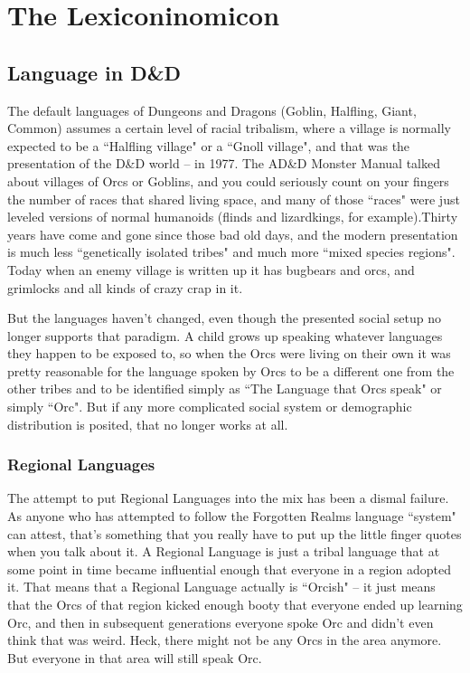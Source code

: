\section{The Lexiconinomicon} %

\subsection{Language in D\&D}
\vspace*{-8pt}

The default languages of Dungeons and Dragons (Goblin, Halfling, Giant, Common) assumes a certain level of racial tribalism, where a village is normally expected to be a ``Halfling village" or a ``Gnoll village", and that was the presentation of the D\&D world -- in 1977. The AD\&D Monster Manual talked about villages of Orcs or Goblins, and you could seriously count on your fingers the number of races that shared living space, and many of those ``races" were just leveled versions of normal humanoids (flinds and lizardkings, for example).Thirty years have come and gone since those bad old days, and the modern presentation is much less ``genetically isolated tribes" and much more ``mixed species regions". Today when an enemy village is written up it has bugbears and orcs, and grimlocks and all kinds of crazy crap in it.

But the languages haven't changed, even though the presented social setup no longer supports that paradigm. A child grows up speaking whatever languages they happen to be exposed to, so when the Orcs were living on their own it was pretty reasonable for the language spoken by Orcs to be a different one from the other tribes and to be identified simply as ``The Language that Orcs speak" or simply ``Orc". But if any more complicated social system or demographic distribution is posited, that no longer works at all.

\subsubsection{Regional Languages}

The attempt to put Regional Languages into the mix has been a dismal failure. As anyone who has attempted to follow the Forgotten Realms language ``system" can attest, that's something that you really have to put up the little finger quotes when you talk about it. A Regional Language is just a tribal language that at some point in time became influential enough that everyone in a region adopted it. That means that a Regional Language actually is ``Orcish" -- it just means that the Orcs of that region kicked enough booty that everyone ended up learning Orc, and then in subsequent generations everyone spoke Orc and didn't even think that was weird. Heck, there might not be any Orcs in the area anymore. But everyone in that area will still speak Orc.

